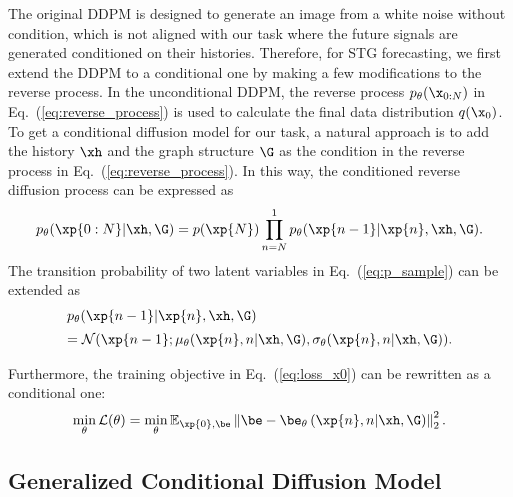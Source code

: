 {\par The original DDPM is designed to generate an image from a white noise without condition, which is not aligned with our task where the future signals are generated conditioned on their histories.  Therefore, for STG forecasting, we first extend the DDPM to a conditional one by making a few modifications to the reverse process. In the unconditional DDPM, the reverse process $p_{\theta}(\x_{0:N})$  in Eq.~(\ref{eq:reverse_process}) is used to calculate the final data distribution $q(\x_0)$. To get a conditional diffusion model for our task, a natural approach is to add the history $\xh$ and the graph structure $\G$ as the condition in the reverse process in Eq.~(\ref{eq:reverse_process}). In this way, the conditioned reverse diffusion process can be expressed as
\begin{equation}
    p_{\theta}(\xp{0:N} | \xh, \G) = p(\xp{N}) \prod_{n=N}^{1}p_\theta(\xp{n-1}|\xp{n}, \xh, \G). 
    \label{eq:condition_reverse_process}
\end{equation}
The transition probability of two latent variables in Eq.~(\ref{eq:p_sample}) can be extended as
\begin{equation}
    \begin{array}{l}
        p_\theta(\xp{n-1}|\xp{n}, \xh, \G) \vspace{5pt}  \\ 
        = \mathcal{N}(\xp{n-1}; {\mu_\theta(\xp{n}, n | \xh, \G), \sigma_\theta(\xp{n}, n | \xh, \G)}).
    \end{array}
    \label{eq:condition_p_sample}
\end{equation}
\par Furthermore, the training objective in Eq.~(\ref{eq:loss_x0}) can be rewritten as a conditional one:
\begin{equation}
\mathop{\min} _\theta \mathcal{L}(\theta)=
\min _\theta \mathbb{E}_{\xp{0}, \be} \left\|\be-\be_\theta\left(\xp{n}, n | \xh, \G\right)\right\|_2^2.
\label{eq:condition_loss}
\end{equation}

\subsection{Generalized Conditional Diffusion Model}

}

